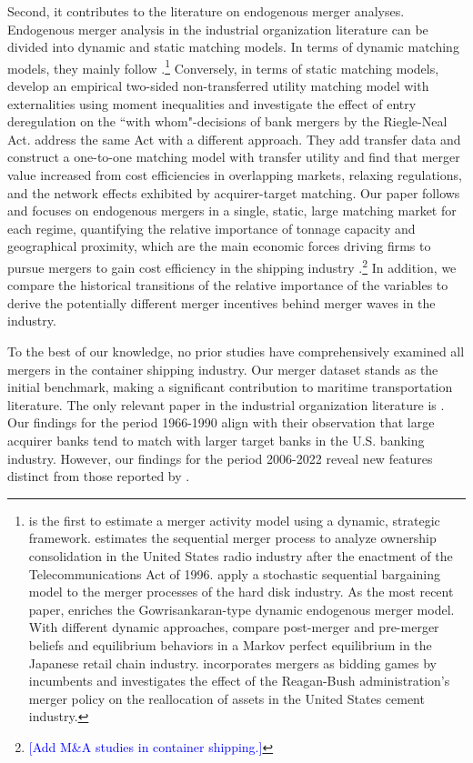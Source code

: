 \documentclass[10pt]{article}
\begin{document}
Second, it contributes to the literature on endogenous merger analyses. 
Endogenous merger analysis in the industrial organization literature can be divided into dynamic and static matching models. 
In terms of dynamic matching models, they mainly follow \cite{gowrisankaran1999dynamic}.\footnote{\cite{stahl2011dynamic} is the first to estimate a merger activity model using a dynamic, strategic framework. \cite{jeziorski2014effects} estimates the sequential merger process to analyze ownership consolidation in the United States radio industry after the enactment of the Telecommunications Act of 1996. \cite{igami2019mergers} apply a stochastic sequential bargaining model to the merger processes of the hard disk industry. As the most recent paper, \cite{hollenbeck2020horizontal} enriches the Gowrisankaran-type dynamic endogenous merger model. With different dynamic approaches, \cite{nishida2015better} compare post-merger and pre-merger beliefs and equilibrium behaviors in a Markov perfect equilibrium in the Japanese retail chain industry. \cite{perez2015building} incorporates mergers as bidding games by incumbents and investigates the effect of the Reagan-Bush administration's merger policy on the reallocation of assets in the United States cement industry.} 
Conversely, in terms of static matching models, \cite{uetake2019entry} develop an empirical two-sided non-transferred utility matching model with externalities using moment inequalities and investigate the effect of entry deregulation on the ``with whom"-decisions of bank mergers by the Riegle-Neal Act. 
\cite{akkus2015ms} address the same Act with a different approach. 
They add transfer data and construct a one-to-one matching model with transfer utility and find that merger value increased from cost efficiencies in overlapping markets, relaxing regulations, and the network effects exhibited by acquirer-target matching. 
Our paper follows \cite{akkus2015ms} and focuses on endogenous mergers in a single, static, large matching market for each regime, quantifying the relative importance of tonnage capacity and geographical proximity, which are the main economic forces driving firms to pursue mergers to gain cost efficiency in the shipping industry \citep{notteboom2004container}.\footnote{\textcolor{blue}{[Add M\&A studies in container shipping.]}} 
In addition, we compare the historical transitions of the relative importance of the variables to derive the potentially different merger incentives behind merger waves in the industry.

To the best of our knowledge, no prior studies have comprehensively examined all mergers in the container shipping industry. Our merger dataset stands as the initial benchmark, making a significant contribution to maritime transportation literature. The only relevant paper in the industrial organization literature is \cite{akkus2015ms}. Our findings for the period 1966-1990 align with their observation that large acquirer banks tend to match with larger target banks in the U.S. banking industry. However, our findings for the period 2006-2022 reveal new features distinct from those reported by \cite{akkus2015ms}.
\end{document}
